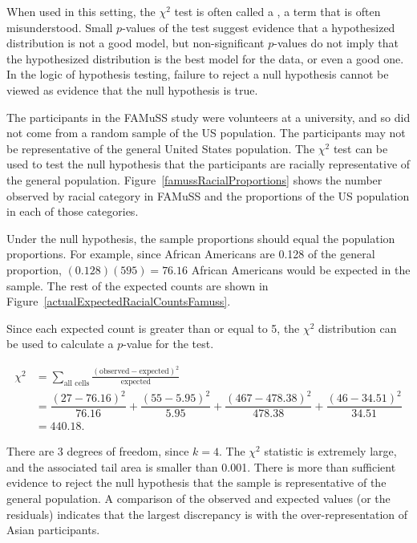 When used in this setting, the $\chi^2$ test is often called a , a term that is often misunderstood.  Small $p$-values of the test suggest evidence that a hypothesized distribution is not a good model, but non-significant $p$-values do not imply that the hypothesized distribution is the best model for the data, or even a good one. In the logic of hypothesis testing, failure to reject a null hypothesis cannot be viewed as evidence that the null hypothesis is true.


\begin{examplewrap}
\begin{nexample}{The participants in the FAMuSS study were volunteers at a university, and so did not come from a random sample of the US population.  The participants may not be representative of the general United States population. The $\chi^2$ test can be used to test the null hypothesis that the participants are racially representative of the general population. Figure~\ref{famussRacialProportions} shows the number observed by racial category in FAMuSS and the proportions of the US population in each of those categories.\footnotemark{}}

Under the null hypothesis, the sample proportions should equal the population proportions. For example, since African Americans are 0.128 of the general proportion, $(0.128)(595) = 76.16$ African Americans would be expected in the sample.  The rest of the expected counts are shown in Figure~\ref{actualExpectedRacialCountsFamuss}.

Since each expected count is greater than or equal to 5,  the $\chi^2$ distribution can be used to calculate a $p$-value for the test.

\begin{align*}
\chi^2 &= \sum_{\text{all cells}} \frac{(\text{observed} - \text{expected})^2}{\text{expected}} \\
&= \dfrac{(27-76.16)^2}{76.16} + \dfrac{(55-5.95)^2}{5.95} + \dfrac{(467-478.38)^2}{478.38} + \dfrac{(46-34.51)^2}{34.51} \\
&=440.18.
\end{align*}

There are 3 degrees of freedom, since $k = 4$. The $\chi^2$ statistic is extremely large, and the associated tail area is smaller than 0.001. There is more than sufficient evidence to reject the null hypothesis that the sample is representative of the general population. A comparison of the observed and expected values (or the residuals) indicates that the largest discrepancy is with the over-representation of Asian participants.
\end{nexample}
\end{examplewrap}

